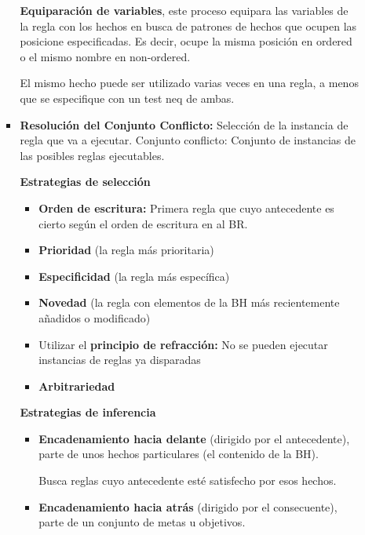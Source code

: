 \documentclass[12pt, twoside, openright]{report} %
\begin{document}
\begin{itemize}
\begin{itemize}
\begin{itemize}
			                  \textbf{Equiparación de variables}, este proceso equipara las variables de la regla con los hechos en busca de patrones de hechos que ocupen las posicione especificadas. Es decir, ocupe la misma posición en ordered o el mismo nombre en non-ordered.
			                  
			                  El mismo hecho puede ser utilizado varias veces en una regla, a menos que se especifique con un test neq de ambas.
			                  
			            \item \textbf{Resolución del Conjunto Conflicto:} Selección de la instancia de regla que va a ejecutar.
			                  Conjunto conflicto: Conjunto de instancias de las posibles reglas ejecutables.
			                  
			                  \textbf{Estrategias de selección}
			                  \begin{itemize}
				                  \item \textbf{Orden de escritura:} Primera regla que cuyo antecedente es cierto según el orden de escritura en al BR.
				                  \item \textbf{Prioridad} (la regla más prioritaria)
				                  \item \textbf{Especificidad} (la regla más específica)
				                  \item \textbf{Novedad} (la regla con elementos de la BH más recientemente añadidos o modificado)
				                  \item Utilizar el \textbf{principio de refracción:} No se pueden ejecutar instancias de reglas ya disparadas
				                  \item \textbf{Arbitrariedad}
			                  \end{itemize}
			                  
			                  \textbf{Estrategias de inferencia}
			                  \begin{itemize}
				                  \item \textbf{Encadenamiento hacia delante} (dirigido por el antecedente), parte de unos hechos particulares (el contenido de la BH).
				                        
				                        Busca reglas cuyo antecedente esté satisfecho por esos hechos.
				                  \item \textbf{Encadenamiento hacia atrás} (dirigido por el consecuente), parte de un conjunto de metas u objetivos.
				                        

\end{itemize}
\end{itemize}
\end{itemize}
\end{itemize}
\end{document}
